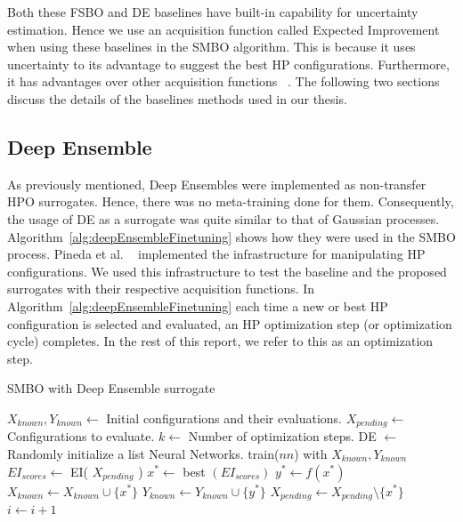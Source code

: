 \documentclass[12pt, twoside, ngerman]{report}
\begin{document}
Both these FSBO and DE baselines have built-in capability for uncertainty estimation.
Hence we use an acquisition function called Expected Improvement when using these baselines in the SMBO algorithm.
This is because it uses uncertainty to its advantage to suggest the best HP configurations.
Furthermore, it has advantages over other acquisition functions ~\cite{Jones1998}.
The following two sections discuss the details of the baselines methods used in our thesis.

\subsection{Deep Ensemble}

As previously mentioned, Deep Ensembles were implemented as non-transfer HPO surrogates.
Hence, there was no meta-training done for them.
Consequently, the usage of DE as a surrogate was quite similar to that of Gaussian processes.
Algorithm~\ref{alg:deepEnsembleFinetuning} shows how they were used in the SMBO process. Pineda et al. ~\cite{pineda2021hpob} implemented the infrastructure for manipulating HP configurations. We used this infrastructure to test the baseline and the proposed surrogates with their respective acquisition functions.
In Algorithm~\ref{alg:deepEnsembleFinetuning}  each time a new or best HP configuration is selected and evaluated,  an HP optimization step (or optimization cycle) completes.
In the rest of this report,  we refer to this as an optimization step.

\begin{algorithm}[htb]
\caption{SMBO with Deep Ensemble surrogate}
\label{alg:deepEnsembleFinetuning}
\begin{algorithmic}
    \State $X_{known},  Y_{known} \gets$ Initial configurations and their evaluations.
    \State $X_{pending} \gets$ Configurations to evaluate.
    \State $k \gets$ Number of optimization steps.
        \State DE $\gets$ Randomly initialize a list Neural Networks. 
          
            \State train($nn$) with $X_{known},  Y_{known}$
        \EndFor
        \State $EI_{scores} \gets$ EI( $X_{pending}$ ) 
        \State $x^* \gets $ best $(EI_{scores})$
        \State $y^* \gets f(x^*)$ 
        \State $X_{known} \gets X_{known} \cup \{x^*\}$
        \State $Y_{known} \gets Y_{known} \cup \{y^*\}$
        \State $X_{pending} \gets X_{pending} \setminus \{x^*\}$ 
        \State $i \gets i + 1$
    \EndFor
    
\end{algorithmic}
\end{algorithm}
\end{document}
